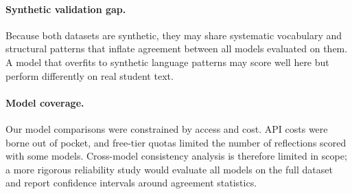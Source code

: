 \documentclass[11pt]{article}
\begin{document}
\paragraph{Synthetic validation gap.}
Because both datasets are synthetic, they may share systematic vocabulary and structural patterns that inflate agreement between all models evaluated on them. A model that overfits to synthetic language patterns may score well here but perform differently on real student text.

\paragraph{Model coverage.}
Our model comparisons were constrained by access and cost. API costs were borne out of pocket, and free-tier quotas limited the number of reflections scored with some models. Cross-model consistency analysis is therefore limited in scope; a more rigorous reliability study would evaluate all models on the full dataset and report confidence intervals around agreement statistics.
%


\end{document}

